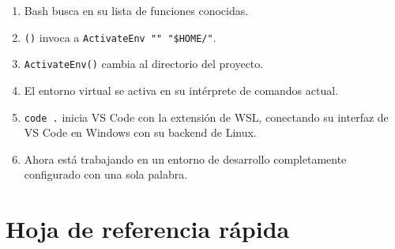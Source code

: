 \begin{enumerate}
  \item Bash busca \texttt{\ProjectName{}} en su lista de funciones conocidas.
  \item \texttt{\ProjectName{}()} invoca a \texttt{ActivateEnv "\ProjectName{}" "\$HOME/\ProjectName{}"}.
  \item \texttt{ActivateEnv()} cambia al directorio del proyecto.
  \item El entorno virtual se activa en su intérprete de comandos actual.
  \item \texttt{code .} inicia VS Code con la extensión de WSL, conectando
        su interfaz de VS Code en Windows con su backend de Linux.
  \item Ahora está trabajando en un entorno de desarrollo completamente
        configurado con una sola palabra.
\end{enumerate}

\section{Hoja de referencia rápida}
\label{sec:cheatsheet}

